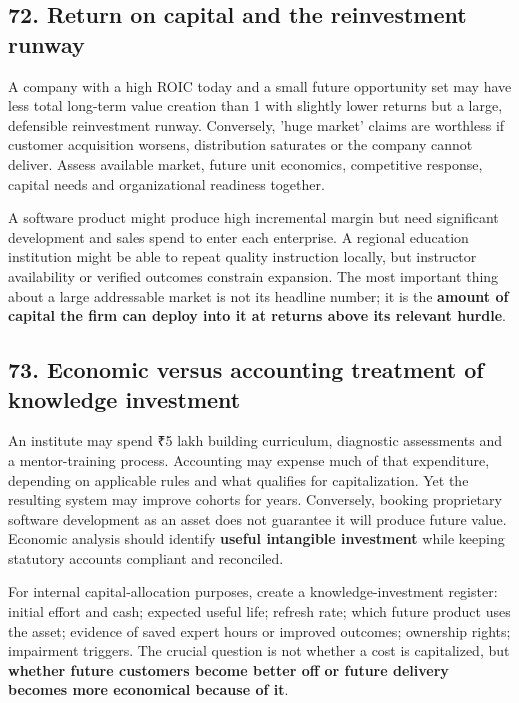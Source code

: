 \subsection{72. Return on capital and the reinvestment runway}


A company with a high ROIC today and a small future opportunity set may have less total long-term value creation than 1 with slightly lower returns but a large, defensible reinvestment runway. Conversely, 'huge market' claims are worthless if customer acquisition worsens, distribution saturates or the company cannot deliver. Assess available market, future unit economics, competitive response, capital needs and organizational readiness together.

A software product might produce high incremental margin but need significant development and sales spend to enter each enterprise. A regional education institution might be able to repeat quality instruction locally, but instructor availability or verified outcomes constrain expansion. The most important thing about a large addressable market is not its headline number; it is the \textbf{amount of capital the firm can deploy into it at returns above its relevant hurdle}.

\subsection{73. Economic versus accounting treatment of knowledge investment}


An institute may spend ₹5 lakh building curriculum, diagnostic assessments and a mentor-training process. Accounting may expense much of that expenditure, depending on applicable rules and what qualifies for capitalization. Yet the resulting system may improve cohorts for years. Conversely, booking proprietary software development as an asset does not guarantee it will produce future value. Economic analysis should identify \textbf{useful intangible investment} while keeping statutory accounts compliant and reconciled.

For internal capital-allocation purposes, create a knowledge-investment register: initial effort and cash; expected useful life; refresh rate; which future product uses the asset; evidence of saved expert hours or improved outcomes; ownership rights; impairment triggers. The crucial question is not whether a cost is capitalized, but \textbf{whether future customers become better off or future delivery becomes more economical because of it}.

